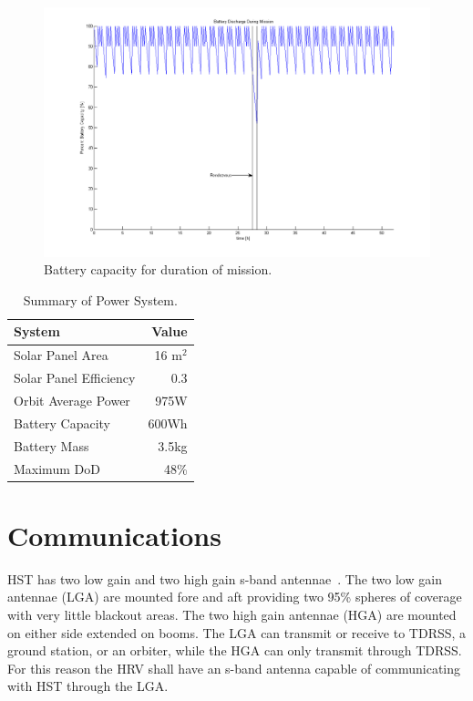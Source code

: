 \documentclass[paper=letter, fontsize=11pt]{scrartcl} %
\numberwithin{equation}{section} %
\numberwithin{figure}{section} %
\numberwithin{table}{section} %
\begin{document}
\begin{figure}[H]
\begin{center}
\includegraphics[width=.8\textwidth]{figs/BatteryDischarge.png}
\caption{Battery capacity for duration of mission.}
\label{fig:battery}
\end{center}
\end{figure}

\begin{table}[H]
\begin{center}
\begin{tabular}{l r}
\toprule
System & Value \\
\midrule
Solar Panel Area		& 16 m$^2$	 \\
Solar Panel Efficiency	&  0.3	 \\
Orbit Average Power		&  975W	 \\
Battery Capacity		& 600Wh	 \\
Battery Mass			& 3.5kg	 \\
Maximum DoD				&  48\%	 \\
\bottomrule
\end{tabular}
\end{center}
\caption{Summary of Power System.}
\end{table}


\section{Communications}

HST has two low gain and two high gain s-band antennae~\cite{csm}. The two low gain antennae (LGA) are mounted fore and aft providing two 95\% spheres of coverage with very little blackout areas. The two high gain antennae (HGA) are mounted on either side extended on booms. The LGA can transmit or receive to TDRSS, a ground station, or an orbiter, while the HGA can only transmit through TDRSS. For this reason the HRV shall have an s-band antenna capable of communicating with HST through the LGA.
\end{document}
